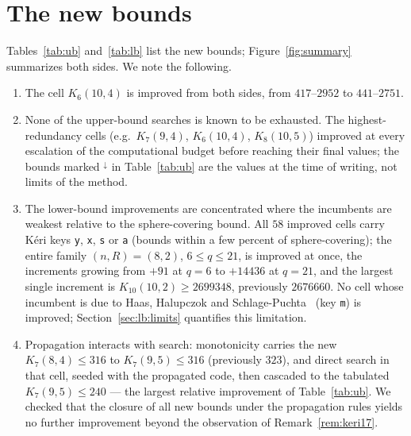 \documentclass[11pt]{amsart}
\newcommand{\Kq}[3]{K_{#1}(#2,#3)}
\begin{document}
\section{The new bounds}\label{sec:results}

Tables~\ref{tab:ub} and~\ref{tab:lb} list the new bounds;
Figure~\ref{fig:summary} summarizes both sides. We note the following.

\begin{enumerate}
\item The cell $\Kq{6}{10}{4}$ is improved from both sides, from
$417$--$2952$ to $441$--$2751$.
\item None of the upper-bound searches is known to be exhausted. The
highest-redundancy cells (e.g.\ $\Kq{7}{9}{4}$, $\Kq{6}{10}{4}$,
$\Kq{8}{10}{5}$) improved at every escalation of the computational budget
before reaching their final values;
the bounds marked ${}^{\downarrow}$ in Table~\ref{tab:ub} are the values at
the time of writing, not limits of the method.
\item The lower-bound improvements are concentrated where the incumbents
are weakest relative to the sphere-covering bound. All $58$ improved cells
carry K\'eri keys \texttt{y}, \texttt{x}, \texttt{s} or \texttt{a} (bounds
within a few percent of sphere-covering); the entire family
$(n,R)=(8,2)$, $6\le q\le 21$, is improved at once, the increments growing
from $+91$ at $q=6$ to
$+14436$ at $q=21$, and the largest single increment is
$\Kq{10}{10}{2}\ge 2699348$, previously $2676660$. No cell whose incumbent
is due to Haas, Halupczok and Schlage-Puchta~\cite{HHSP2009}
(key \texttt{m}) is improved;
Section~\ref{sec:lb:limits} quantifies this limitation.
\item Propagation interacts with search: monotonicity carries the new
$\Kq{7}{8}{4}\le 316$ to $\Kq{7}{9}{5}\le 316$ (previously $323$), and
direct search in that cell, seeded with the propagated code, then
cascaded to the tabulated $\Kq{7}{9}{5}\le 240$ --- the largest relative
improvement of Table~\ref{tab:ub}. We checked that the closure of all new
bounds under the propagation rules yields no further improvement beyond
the observation of Remark~\ref{rem:keri17}.
\end{enumerate}

\begin{table}[t]
\centering
\small
\ubtable
\caption{New upper bounds. ``Previous bounds'' are the lower--upper pairs
of K\'eri's tables~\cite{Keri}; a bold lower bound is from
Table~\ref{tab:lb} of this paper. ``Sphere'' is the sphere-covering bound
$\lceil q^n/|B_R|\rceil$. ``Key'' is the source annotation of the
previous upper bound in~\cite{Keri}: \ubkeylegend. ``Via'' names the
producing method: L $=$ the local search of Section~\ref{sec:method},
T $=$ the transform engine of Section~\ref{sec:gpu}, M $=$ monotonicity
propagation of another new bound. Percentages are rounded to one decimal.
A ${}^{\downarrow}$ marks bounds whose descent had not stalled when this
version was prepared; all other bounds resisted a dedicated
attack at $M-1$ at the final budget.}
\label{tab:ub}
\end{table}
\end{document}

